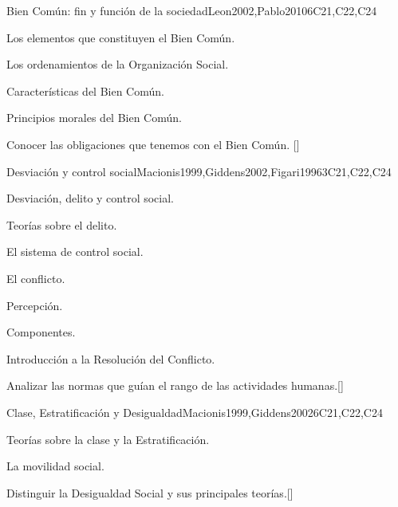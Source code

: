 \begin{syllabus}
\begin{unit}{}{Bien Común: fin y función de la sociedad}{Leon2002,Pablo2010}{6}{C21,C22,C24}
\begin{topics}
    \item Los elementos que constituyen el Bien Común.
    \item Los ordenamientos de la Organización Social.
    \item Caracterí­sticas del Bien Común.
    \item Principios morales del Bien Común.
\end{topics}
\begin{learningoutcomes}
    \item Conocer las obligaciones que tenemos con el Bien Común. [\Familiarity]
\end{learningoutcomes}
\end{unit}

\begin{unit}{}{Desviación y control social}{Macionis1999,Giddens2002,Figari1996}{3}{C21,C22,C24}
\begin{topics}
    \item Desviación, delito  y control social.
    \item Teorí­as sobre el delito.
    \item El sistema de control social.
    \item El conflicto.
    \begin{subtopics}
	    \item Percepción.
	    \item Componentes.
    \end{subtopics}
    \item Introducción a la Resolución del Conflicto.
\end{topics}
\begin{learningoutcomes}
    \item Analizar las normas que guí­an el rango de las actividades humanas.[\Familiarity]
\end{learningoutcomes}
\end{unit}

\begin{unit}{}{Clase, Estratificación y Desigualdad}{Macionis1999,Giddens2002}{6}{C21,C22,C24}
\begin{topics}
    \item Teorí­as sobre la clase y la  Estratificación.
    \item La movilidad social.
\end{topics}
\begin{learningoutcomes}
	\item Distinguir la Desigualdad Social y sus principales teorí­as.[\Familiarity]
\end{learningoutcomes}
\end{unit}


\end{syllabus}
